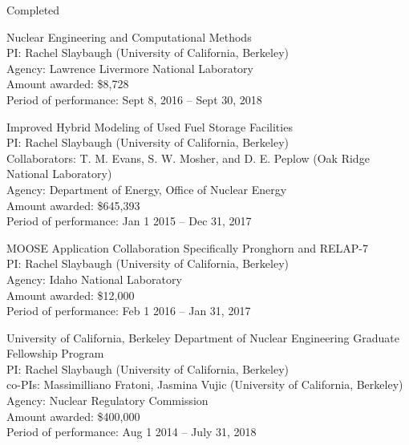 
\begin{rSubsection}{Completed}{}{}{}
\item Nuclear Engineering and Computational Methods\\
PI: Rachel Slaybaugh (University of California, Berkeley)\\
Agency: Lawrence Livermore National Laboratory \\
Amount awarded: \$8,728\\
Period of performance: Sept 8, 2016 -- Sept 30, 2018	

\vspace*{0.3 em}
\item Improved Hybrid Modeling of Used Fuel Storage Facilities\\
PI: Rachel Slaybaugh (University of California, Berkeley)\\
\hspace*{1 em}  Collaborators: T. M. Evans, S. W. Mosher, and D. E. Peplow (Oak Ridge National Laboratory)\\
Agency: Department of Energy, Office of Nuclear Energy \\
Amount awarded: \$645,393\\
Period of performance: Jan 1 2015 -- Dec 31, 2017

\vspace*{0.3 em}
\item MOOSE Application Collaboration Specifically Pronghorn and RELAP-7\\ 
PI: Rachel Slaybaugh (University of California, Berkeley)\\
Agency: Idaho National Laboratory \\
Amount awarded: \$12,000\\
Period of performance: Feb 1 2016 -- Jan 31, 2017

\vspace*{0.3 em}
\item University of California, Berkeley Department of Nuclear Engineering Graduate Fellowship Program\\ 
PI: Rachel Slaybaugh (University of California, Berkeley)\\
\hspace*{1 em} co-PIs: Massimilliano Fratoni, Jasmina Vujic (University of California, Berkeley)\\
Agency: Nuclear Regulatory Commission \\
Amount awarded: \$400,000\\
Period of performance: Aug 1 2014 -- July 31, 2018


\end{rSubsection}
